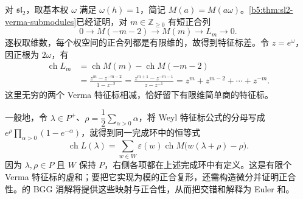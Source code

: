 \ProseParagraphBreak
对 \(\mathfrak{sl}_2\)，取基本权 \(\omega\) 满足 \(\omega(h)=1\)，简记 \(M(a)=M(a\omega)\)。\cref{b5:thm:sl2-verma-submodules}已经证明，对 \(m\in\mathbb Z_{\ge0}\) 有短正合列
\[
	0\longrightarrow M(-m-2)\longrightarrow M(m) \longrightarrow L_m\longrightarrow0.
\]
逐权取维数，每个权空间的正合列都是有限维的，故得到特征标差。令 \(z=e^\omega\)，因正根为 \(2\omega\)，有
\[
	\begin{aligned}
		\operatorname{ch}L_m &=\operatorname{ch}M(m)-\operatorname{ch}M(-m-2)\\
		&=\frac{z^m-z^{-m-2}}{1-z^{-2}} =\frac{z^{m+1}-z^{-m-1}}{z-z^{-1}} =z^m+z^{m-2}+\cdots+z^{-m}.
	\end{aligned}
\]
这里无穷的两个 Verma 特征标相减，恰好留下有限维简单商的特征标。

\ProseParagraphBreak
一般地，令 \(\lambda\in P^+\)、\(\rho=\dfrac12\sum_{\alpha>0}\alpha\)，将 Weyl 特征标公式的分母写成 \(e^\rho\prod_{\alpha>0}(1-e^{-\alpha})\)，就得到同一完成环中的恒等式
\[
	\operatorname{ch}L(\lambda) =\sum_{w\in W}\varepsilon(w) \operatorname{ch}M\bigl(w(\lambda+\rho)-\rho\bigr).
\]
因为 \(\lambda,\rho\in P\) 且 \(W\) 保持 \(P\)，右侧各项都在上述完成环中有定义。这是有限个 Verma 特征标的虚和；要把它实现为模的正合复形，还需构造微分并证明正合性。的 BGG 消解将提供这些映射与正合性，从而把交错和解释为 Euler 和。
